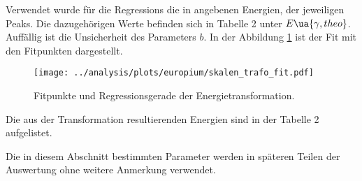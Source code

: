 Verwendet wurde für die Regressions die in \cite{anleitungv18} angebenen Energien,
der jeweiligen Peaks. Die dazugehörigen Werte befinden sich in Tabelle 2 %
unter $E\ua{\gamma,theo}$.
Auffällig ist die Unsicherheit des Parameters $b$.
In der Abbildung \ref{fig:skalen_trafo_fit} ist der Fit mit den Fitpunkten dargestellt.
\begin{figure}
  \centering
  \texttt{[image: ../analysis/plots/europium/skalen\_trafo\_fit.pdf]}
  \caption{Fitpunkte und Regressionsgerade der Energietransformation.}
  \label{fig:skalen_trafo_fit}
\end{figure}
Die aus der Transformation resultierenden Energien sind in der Tabelle 2 %
aufgelistet.

Die in diesem Abschnitt bestimmten Parameter werden in späteren Teilen der Auswertung
ohne weitere Anmerkung verwendet.
\FloatBarrier

